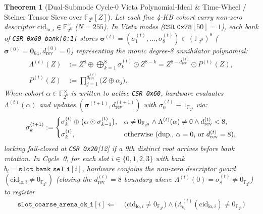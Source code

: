 \documentclass[11pt,letterpaper]{article}
\theoremstyle{spectralthm}
\newtheorem{theorem}{Theorem}[section]
\begin{document}
\begin{theorem}[Dual-Submode Cycle-0 Vieta Polynomial-Ideal \& Time-Wheel / Steiner Tensor Sieve over {$\mathbb{F}_{2^8}[Z]$}]
\label{thm:vieta}
Let each fine 4-KB cohort carry non-zero descriptor $\mathrm{cid}_{\mathrm{lo},i} \in \mathbb{F}_{2^8}^\times$ ($N = 255$). In Vieta modes ($\texttt{CSR 0x78}[50] = 1$), each bank of \texttt{CSR 0x60\_bank[0:1]} stores $\boldsymbol{\sigma}^{(t)} = (\sigma_1^{(t)}, \ldots, \sigma_8^{(t)}) \in (\mathbb{F}_{2^8})^8$ ($\boldsymbol{\sigma}^{(0)} = \mathbf{0}_{64}, d_{\mathrm{rev}}^{(0)} = 0$) representing the monic degree-8 annihilator polynomial:
\begin{equation}
\label{eq:vieta_poly}
\begin{aligned}
\Lambda^{(t)}(Z) &:= Z^8 \oplus \bigoplus_{k=1}^8 \sigma_k^{(t)} \odot Z^{8-k} = Z^{8 - d_{\mathrm{rev}}^{(t)}} \odot P^{(t)}(Z),\\
P^{(t)}(Z) &:= \prod_{j=1}^{d_{\mathrm{rev}}^{(t)}} \bigl(Z \oplus \alpha_j\bigr).
\end{aligned}
\end{equation}
When cohort $\alpha \in \mathbb{F}_{2^8}^\times$ is written to active \texttt{CSR 0x60}, hardware evaluates $\Lambda^{(t)}(\alpha)$ and updates $(\boldsymbol{\sigma}^{(t+1)}, d_{\mathrm{rev}}^{(t+1)})$ with $\sigma_0^{(t)} \equiv 1_{\mathbb{F}_{2^8}}$ via:
\begin{equation}
\label{eq:vieta_ratchet}
\sigma_k^{(t+1)} :=
\begin{dcases}
\sigma_k^{(t)} \oplus \bigl(\alpha \odot \sigma_{k-1}^{(t)}\bigr), & \alpha \neq 0_{\mathbb{F}_{2^8}} \wedge \Lambda^{(t)}(\alpha) \neq 0 \wedge d_{\mathrm{rev}}^{(t)} < 8,\\
\sigma_k^{(t)}, & \text{otherwise (dup., }\alpha = 0\text{, or }d_{\mathrm{rev}}^{(t)} = 8\text{)},
\end{dcases}
\end{equation}
locking fail-closed at \texttt{CSR 0x20}[12] if a 9th distinct root arrives before bank rotation. In Cycle~0, for each slot $i \in \{0,1,2,3\}$ with bank $b_i = \texttt{slot\_bank\_sel\_i}[i]$, hardware conjoins the non-zero descriptor guard $(\mathrm{cid}_{\mathrm{lo},i} \neq 0_{\mathbb{F}_{2^8}})$ (closing the $d_{\mathrm{rev}}^{(t)}=8$ boundary where $\Lambda^{(t)}(0) = \sigma_8^{(t)} \neq 0_{\mathbb{F}_{2^8}}$) to register
\[
\begin{aligned}
\texttt{slot\_coarse\_arena\_ok\_i}[i] \Leftarrow\;& \bigl(\mathrm{cid}_{\mathrm{lo},i} \neq 0_{\mathbb{F}_{2^8}}\bigr)
\wedge \bigl(\Lambda_{b_i}^{(t)}(\mathrm{cid}_{\mathrm{lo},i}) \neq 0_{\mathbb{F}_{2^8}}\bigr)\\

\end{aligned}\]
\end{theorem}
\end{document}
